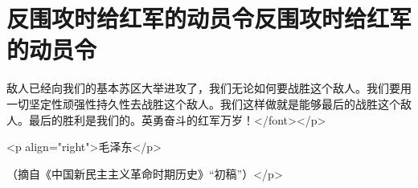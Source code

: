 \section[反围攻时给红军的动员令反围攻时给红军的动员令]{反围攻时给红军的动员令反围攻时给红军的动员令}


敌人已经向我们的基本苏区大举进攻了，我们无论如何要战胜这个敌人。我们要用一切坚定性顽强性持久性去战胜这个敌人。我们这样做就是能够最后的战胜这个敌人。最后的胜利是我们的。英勇奋斗的红军万岁！</font></p>


<p align="right">毛泽东</p>

（摘自《中国新民主主义革命时期历史》“初稿”）</p>

